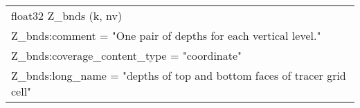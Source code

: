 \begin{longtable}{|p{\textwidth}|}
\rowcolor{Apricot}\hspace{0.5cm}float32 Z\_bnds (k, nv)\\
\rowcolor{Apricot}\hspace{0.5cm}\hspace{0.5cm}Z\_bnds:comment = "One pair of depths for each vertical level."\\
\rowcolor{Apricot}\hspace{0.5cm}\hspace{0.5cm}Z\_bnds:coverage\_content\_type = "coordinate"\\
\rowcolor{Apricot}\hspace{0.5cm}\hspace{0.5cm}Z\_bnds:long\_name = "depths of top and bottom faces of tracer grid cell"\\
\hline


\end{longtable}

